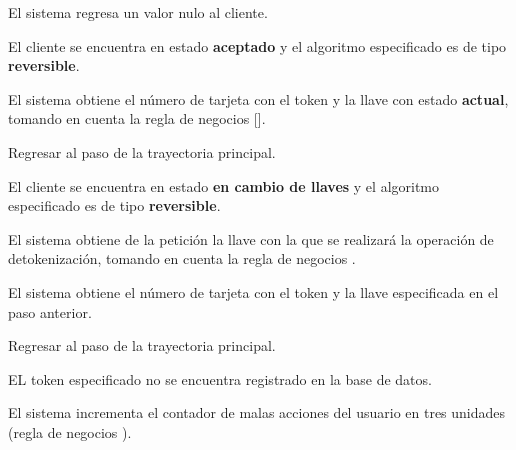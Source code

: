 {\begin{trayectoriaAlternativa}
    \item El sistema regresa un valor nulo al cliente.

  \end{trayectoriaAlternativa}

  \begin{trayectoriaAlternativa}
    {El cliente se encuentra en estado \textbf{aceptado} y el algoritmo
    especificado es de tipo \textbf{reversible}.}

    \item El sistema obtiene el número de tarjeta con el token y la llave
      con estado \textbf{actual}, tomando en cuenta la regla de negocios
      [].

    \item Regresar al paso  de la trayectoria
      principal.

  \end{trayectoriaAlternativa}

  \begin{trayectoriaAlternativa}
    {El cliente se encuentra en estado \textbf{en cambio de llaves} y el
    algoritmo especificado es de tipo \textbf{reversible}.}

    \item El sistema obtiene de la petición la llave con la que se realizará
      la operación de detokenización, tomando en cuenta la regla de negocios
      .

    \item El sistema obtiene el número de tarjeta con el token y la llave
      especificada en el paso anterior.

    \item Regresar al paso  de la trayectoria
      principal.

  \end{trayectoriaAlternativa}

  \begin{trayectoriaAlternativa}
    {EL token especificado no se encuentra registrado en la base de datos.}


    \item El sistema incrementa el contador de malas acciones del usuario
      en tres unidades (regla de negocios
      ).


\end{trayectoriaAlternativa}}
